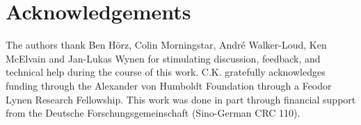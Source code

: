 \section*{Acknowledgements}\label{sec:acknowledgements}

The authors thank
Ben H\"{o}rz,
Colin Morningstar,
Andr\'{e} Walker-Loud,
Ken McElvain
and
Jan-Lukas Wynen
for stimulating discussion, feedback, and technical help during the course of this work.
C.K. gratefully acknowledges funding through the Alexander von Humboldt Foundation through a Feodor Lynen Research Fellowship.
This work was done in part through financial support from the Deutsche Forschungsgemeinschaft (Sino-German CRC 110).
